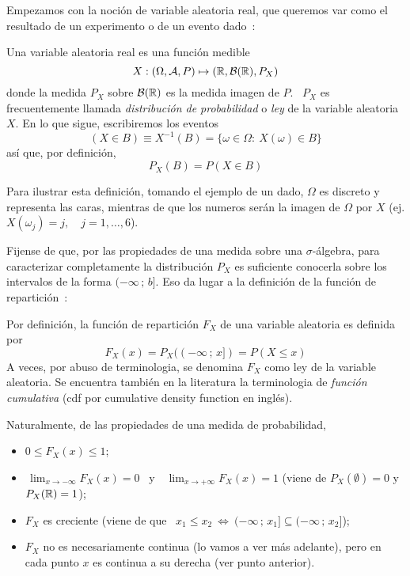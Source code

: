 Empezamos con la  noci\'on de variable aleatoria real, que  queremos var como el
resultado de un experimento o de un evento dado~\cite{AthLah06, Coh13, Bre88}:
%
\begin{definicion}
  Una variable aleatoria real es una funci\'on medible
  \[
  X: (\Omega,\mathcal{A},P) \mapsto (\mathbb{R},\mathcal{B}(\mathbb{R}),P_X)
  \]
  donde la medida  $P_X$ sobre $\mathcal{B}(\mathbb{R})$ es la medida imagen  de $P$.  \ $P_X$
  es frecuentemente llamada {\it distribuci\'on  de probabilidad} o {\it ley} de
  la variable aleatoria $X$. En lo que sigue, escribiremos los eventos
  \[
  (X \in B) \equiv X^{-1}(B) = \{ \omega \in \Omega: \: X(\omega) \in B \}
  \]
  as\'i que, por definici\'on,
  \[
  P_X(B) = P(X \in B)
  \]
\end{definicion}
%
Para  ilustrar esta definici\'on,  tomando el  ejemplo de  un dado,  $\Omega$ es
discreto y representa  las caras, mientras de que los  numeros ser\'an la imagen
de $\Omega$ por $X$ (ej. $X(\omega_j) = j, \quad j = 1, \ldots , 6$).

Fijense de que, por las  propiedades de una medida sobre una $\sigma$-\'algebra,
para caracterizar completamente la  distribuci\'on $P_X$ es suficiente conocerla
sobre  los intervalos de  la forma  $(-\infty \,  ; \,  b]$. Eso  da lugar  a la
definici\'on  de  la funci\'on  de  repartici\'on~\cite{AthLah06, Coh13,  Bre88,
  HogMck13}:
%
\begin{definicion}
  Por  definici\'on,  la  funci\'on  de  repartici\'on  $F_X$  de  una  variable
  aleatoria es definida por
  \[
  F_X(x) = P_X((-\infty \, ; \, x]) = P(X \le x)
  \]
  A veces, por abuso de terminologia,  se denomina $F_X$ como ley de la variable
  aleatoria. Se  encuentra tambi\'en  en la literatura  la terminologia  de {\it
    funci\'on cumulativa} (cdf por cumulative density function en ingl\'es).
\end{definicion}
%
Naturalmente, de las propiedades de una medida de probabilidad,
%
\begin{itemize}
\item $0 \le F_X(x) \le 1$;
%
\item $\displaystyle \, \lim_{x \to -\infty} F_X(x) = 0$ \ y \ $\displaystyle \,
  \lim_{x \to +\infty} F_X(x) = 1$  (viene de $P_X(\emptyset) = 0$ y $P_X(\mathbb{R})
  = 1$);
%
\item  $F_X$ es creciente  \big(viene de  que \  $x_1 \le  x_2 \:  \Leftrightarrow \:
  (-\infty \, ; \, x_1] \subseteq (-\infty \, ; \, x_2]$\big);
%
\item $F_X$ no es necesariamente continua  (lo vamos a ver m\'as adelante), pero
  en cada punto $x$ es continua a su derecha (ver punto anterior).
\end{itemize}


